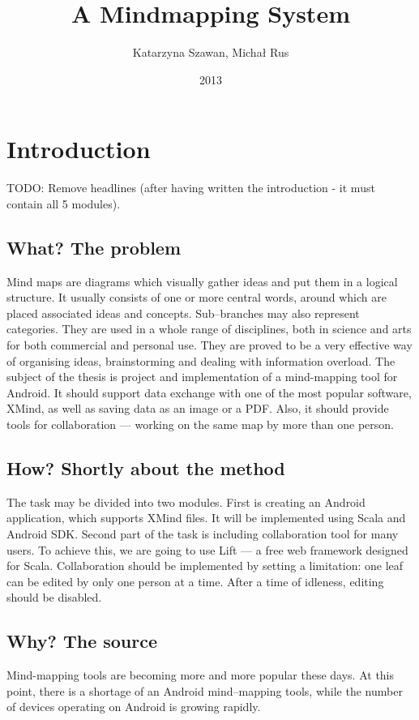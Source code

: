 \documentclass[american]{bsc}
\title{A Mindmapping System}
\author{Katarzyna Szawan, Michał Rus}
\date{2013}
\begin{document}
\maketitle

\chapter{Introduction}
\label{chap:introduction}
TODO: Remove headlines (after having written the introduction - it must contain all 5 modules). 
\section{What? The problem}
\label{sec:what}
Mind maps are diagrams which visually gather ideas and put them in a logical structure. It usually consists of one or more central words, around which are placed associated ideas and concepts. Sub--branches may also represent categories.  They are used in a whole range of disciplines, both in science and arts for both commercial and personal use. They are proved to be a very effective way of organising ideas, brainstorming and dealing with information overload. The subject of the thesis is project and implementation of a mind-mapping tool for Android. It should support data exchange with one of the most popular software, XMind, as well as saving data as an image or a PDF. Also, it should provide tools for collaboration --- working on the same map by more than one person.

\section{How? Shortly about the method}
\label{sec:how}
The task may be divided into two modules. First is creating an Android application, which supports XMind files. It will be implemented using Scala and Android SDK. Second part of the task is including collaboration tool for many users. To achieve this, we are going to use Lift --- a free web framework  designed for Scala. Collaboration should be implemented by setting a limitation: one leaf can be edited by only one person at a time. After a time of idleness, editing should be disabled.

\section{Why? The source}
\label{sec:why}
Mind-mapping tools are becoming more and more popular these days. At this point, there is a shortage of an Android mind--mapping tools, while the number of devices operating on Android is growing rapidly. 
\end{document}

